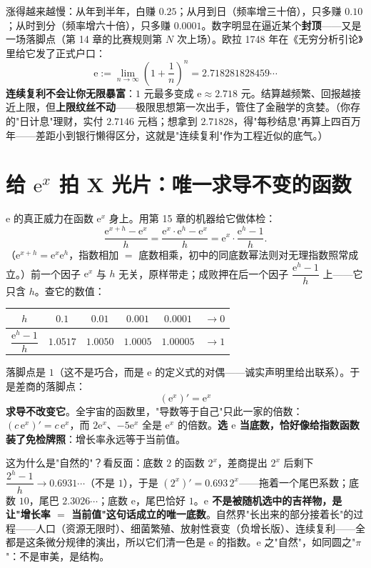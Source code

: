涨得越来越慢：从年到半年，白赚 $0.25$；从月到日（频率增三十倍），只多赚 $0.10$；从时到分（频率增六十倍），只多赚 $0.0001$。数字明显在逼近某个\textbf{封顶}——又是一场落脚点（第 14 章的比赛规则第 $N$ 次上场）。欧拉 1748 年在《无穷分析引论》里给它发了正式户口：
\[
\mathrm{e} := \lim_{n\to\infty}\left(1+\frac1n\right)^n = 2.718281828459\cdots
\]
\textbf{连续复利不会让你无限暴富}：$1$ 元最多变成 $\mathrm{e} \approx 2.718$ 元。结算越频繁、回报越接近上限，但\textbf{上限纹丝不动}——极限思想第一次出手，管住了金融学的贪婪。（你存的"日计息"理财，实付 $2.7146$ 元档；想拿到 $2.71828$，得"每秒结息"再算上四百万年——差距小到银行懒得区分，这就是"连续复利"作为工程近似的底气。）

\section{给 $\mathrm{e}^x$ 拍 X 光片：唯一求导不变的函数}

$\mathrm{e}$ 的真正威力在函数 $\mathrm{e}^x$ 身上。用第 15 章的机器给它做体检：
\[
\frac{\mathrm{e}^{x+h} - \mathrm{e}^x}{h} = \frac{\mathrm{e}^x\cdot \mathrm{e}^h - \mathrm{e}^x}{h} = \mathrm{e}^x\cdot\frac{\mathrm{e}^h - 1}{h} .
\]
（$\mathrm{e}^{x+h} = \mathrm{e}^x\mathrm{e}^h$，指数相加 $=$ 底数相乘，初中的同底数幂法则对无理指数照常成立。）前一个因子 $\mathrm{e}^x$ 与 $h$ 无关，原样带走；成败押在后一个因子 $\dfrac{\mathrm{e}^h - 1}{h}$ 上——它只含 $h$。查它的数值：

\begin{center}
\begin{tabular}{cccccc}
\toprule
$h$ & $0.1$ & $0.01$ & $0.001$ & $0.0001$ & $\to 0$ \\
\midrule
$\dfrac{\mathrm{e}^h - 1}{h}$ & $1.0517$ & $1.0050$ & $1.0005$ & $1.00005$ & $\to 1$ \\
\bottomrule
\end{tabular}
\end{center}

落脚点是 $1$（这不是巧合，而是 $\mathrm{e}$ 的定义式的对偶——诚实声明里给出联系）。于是差商的落脚点：
\[
\boxed{\;\left(\mathrm{e}^x\right)' = \mathrm{e}^x\;}
\]
\textbf{求导不改变它}。全宇宙的函数里，"导数等于自己"只此一家的倍数：$(c\,\mathrm{e}^x)' = c\,\mathrm{e}^x$，而 $2\mathrm{e}^x$、$-5\mathrm{e}^x$ 全是 $\mathrm{e}^x$ 的倍数。\textbf{选 $\mathrm{e}$ 当底数，恰好像给指数函数装了免检牌照}：增长率永远等于当前值。

这为什么是"自然的"？看反面：底数 $2$ 的函数 $2^x$，差商提出 $2^x$ 后剩下 $\dfrac{2^h - 1}{h}\to 0.6931\cdots$（不是 $1$），于是 $(2^x)' = 0.693\,2^x$——拖着一个尾巴系数；底数 $10$，尾巴 $2.3026\cdots$；底数 $\mathrm{e}$，尾巴恰好 $1$。\textbf{$\mathrm{e}$ 不是被随机选中的吉祥物，是让"增长率 $=$ 当前值"这句话成立的唯一底数}。自然界"长出来的部分接着长"的过程——人口（资源无限时）、细菌繁殖、放射性衰变（负增长版）、连续复利——全都是这条微分规律的演出，所以它们清一色是 $\mathrm{e}$ 的指数。$\mathrm{e}$ 之"自然"，如同圆之"$\pi$"：不是审美，是结构。

